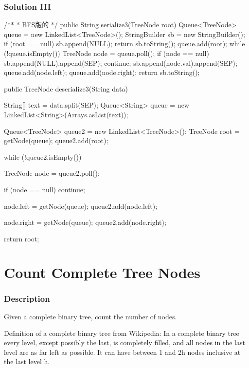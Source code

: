 \newpage

\subsubsection{Solution III}
\begin{Code}
/**
 * BFS版的
 */
public String serialize3(TreeNode root) {
    Queue<TreeNode> queue = new LinkedList<TreeNode>();
    StringBuilder sb = new StringBuilder();
    if (root == null) {
        sb.append(NULL);
        return sb.toString();
    }
    queue.add(root);
    while (!queue.isEmpty()) {
        TreeNode node = queue.poll();
        if (node == null) {
            sb.append(NULL).append(SEP);
            continue;
        }
        sb.append(node.val).append(SEP);
        queue.add(node.left);
        queue.add(node.right);
    }
    return sb.toString();
}

public TreeNode deserialize3(String data) {
    String[] text = data.split(SEP);
    Queue<String> queue = new LinkedList<String>(Arrays.asList(text));

    Queue<TreeNode> queue2 = new LinkedList<TreeNode>();
    TreeNode root = getNode(queue);
    queue2.add(root);

    while (!queue2.isEmpty()) {
        TreeNode node = queue2.poll();

        if (node == null) {
            continue;
        }

        node.left = getNode(queue);
        queue2.add(node.left);

        node.right = getNode(queue);
        queue2.add(node.right);
    }

    return root;
}
\end{Code}

\newpage

\section{Count Complete Tree Nodes} %

\subsubsection{Description}
Given a complete binary tree, count the number of nodes.

Definition of a complete binary tree from Wikipedia:
In a complete binary tree every level, except possibly the last, is completely filled, and all nodes in the last level are as far left as possible. It can have between 1 and 2h nodes inclusive at the last level h.

